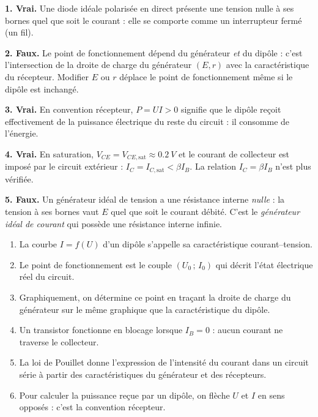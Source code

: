 \documentclass[11pt]{article}
\newcommand{\cle}[1]{{\popxbold\color{popdark}#1}}
\begin{document}
\begin{corrige}
\textbf{1. \textbf{Vrai}.} Une diode idéale polarisée en direct présente une tension nulle à ses bornes quel que soit le courant : elle se comporte comme un interrupteur fermé (un fil).

\textbf{2. \textbf{Faux}.} Le point de fonctionnement dépend du générateur \emph{et} du dipôle : c'est l'intersection de la droite de charge du générateur $(E, r)$ avec la caractéristique du récepteur. Modifier $E$ ou $r$ déplace le point de fonctionnement même si le dipôle est inchangé.

\textbf{3. \textbf{Vrai}.} En convention récepteur, $P = UI > 0$ signifie que le dipôle reçoit effectivement de la puissance électrique du reste du circuit : il consomme de l'énergie.

\textbf{4. \textbf{Vrai}.} En saturation, $V_{CE} = V_{CE,\text{sat}} \approx \SI{0,2}{V}$ et le courant de collecteur est imposé par le circuit extérieur : $I_C = I_{C,\text{sat}} < \beta I_B$. La relation $I_C = \beta I_B$ n'est plus vérifiée.

\textbf{5. \textbf{Faux}.} Un générateur idéal de tension a une résistance interne \emph{nulle} : la tension à ses bornes vaut $E$ quel que soit le courant débité. C'est le \emph{générateur idéal de courant} qui possède une résistance interne infinie.
\end{corrige}

\begin{corrige}
\begin{enumerate}
\item La courbe $I = f(U)$ d'un dipôle s'appelle sa \cle{caractéristique} courant--tension.
\item Le \cle{point de fonctionnement} est le couple $(U_0\,;\,I_0)$ qui décrit l'état électrique réel du circuit.
\item Graphiquement, on détermine ce point en traçant la \cle{droite de charge} du générateur sur le même graphique que la caractéristique du dipôle.
\item Un transistor fonctionne en \cle{blocage} lorsque $I_B = 0$ : aucun courant ne traverse le collecteur.
\item La \cle{loi de Pouillet} donne l'expression de l'intensité du courant dans un circuit série à partir des caractéristiques du générateur et des récepteurs.
\item Pour calculer la puissance reçue par un dipôle, on flèche $U$ et $I$ en sens opposés : c'est la \cle{convention récepteur}.
\end{enumerate}
\end{corrige}
\end{document}
